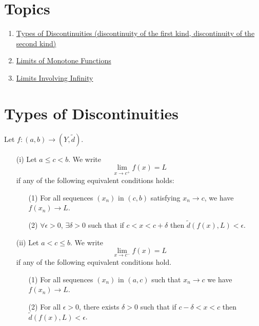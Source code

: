\documentclass[a4paper]{article}
\begin{document}
\section{Topics}

\begin{enumerate}
    \item {\hyperref[Types of Discontinuities]{Types of Discontinuities (discontinuity of the first kind, discontinuity of the second kind)}} 
    \item {\hyperref[Limits of Monotone Functions]{Limits of Monotone Functions}}
    \item {\hyperref[Limits Involving Infinity]{Limits Involving Infinity}}
\end{enumerate}

\section{Types of Discontinuities}\label{Types of Discontinuities}

\begin{definition}
    Let \( f: (a,b) \to (Y, \tilde{d}) \). 
    \begin{enumerate}
        \item[(i)] Let \( a \leq c < b \). We write
            \[  \lim_{ x \to c^{+} } f(x) = L \]
            if any of the following equivalent conditions holds:
            \begin{enumerate}
                \item[(1)] For all sequences \( ({x}_{n}) \) in \( (c,b) \) satisfying \( {x}_{n} \to c  \), we have \( f({x}_{n}) \to L \).
                \item[(2)] \( \forall \epsilon > 0  \), \( \exists \delta > 0  \) such that if \( c < x < c + \delta  \) then \( \tilde{d}(f(x), L) < \epsilon \).
            \end{enumerate}
        \item[(ii)] Let \( a < c \leq b  \). We write
            \[  \lim_{ x \to c^{-} }  f(x) = L \]
            if any of the following equivalent conditions hold.
            \begin{enumerate}
                \item[(1)] For all sequences \( ({x}_{n}) \) in \( (a,c) \) such that \( {x}_{n} \to c  \) we have \( f({x}_{n}) \to L  \).
                \item[(2)] For all \( \epsilon > 0  \), there exists \( \delta > 0  \) such that if \( c - \delta < x < c  \) then \( \tilde{d}(f(x), L) < \epsilon \). 
            \end{enumerate} 
    \end{enumerate}
\end{definition}
\end{document}
